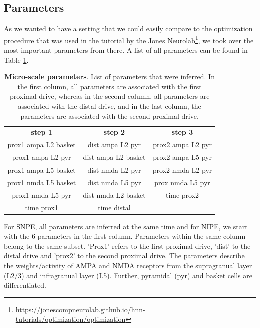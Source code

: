 \documentclass[12pt]{extreport}
\begin{document}
\subsection{Parameters}

As we wanted to have a setting that we could easily compare to the optimization procedure that was used in the tutorial by the Jones Neurolab\footnote{\url{https://jonescompneurolab.github.io/hnn-tutorials/optimization/optimization}\label{tut}}, we took over the most important parameters from there. A list of all parameters can be found in Table \ref{tab:params}.


\begin{table}
\begin{tabular}{c | c | c}
    \textbf{step 1} & \textbf{step 2} & \textbf{step 3} \\
    prox1 ampa L2 basket & dist ampa L2 pyr & prox2 ampa L2 pyr\\
    prox1 ampa L2 pyr & dist ampa L2 basket & prox2 ampa L5 pyr\\
    prox1 ampa L5 basket & dist nmda L2 pyr & prox2 nmda L2 pyr\\
    prox1 nmda L5 basket  & dist nmda L5 pyr & prox nmda L5 pyr \\
    prox1 nmda L5 pyr&  dist nmda L2 basket & time prox2\\
    time prox1  & time distal \\

     
\end{tabular}

\caption{\label{tab:params}\textbf{Micro-scale parameters}. \small List of parameters that were inferred. In the first column, all parameters are associated with the first proximal drive, whereas in the second column, all parameters are associated with the distal drive, and in the last column, the parameters are associated with the second proximal drive.}

\end{table}

For SNPE, all parameters are inferred at the same time and for NIPE, we start with the 6 parameters in the first column. Parameters within the same column belong to the same subset.
'Prox1' refers to the first proximal drive, 'dist' to the distal drive and 'prox2' to the second proximal drive. The parameters describe the weights/activity of AMPA and NMDA receptors from the supragranual layer (L2/3) and infragranual layer (L5). Further, pyramidal (pyr) and basket cells are differentiated. 
\end{document}
